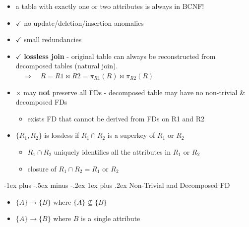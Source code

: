 \documentclass[10pt, landscape]{article}
\makeatletter
\renewcommand{\subsubsection}{\@startsection{subsubsection}{3}{0mm}%
  {-1ex plus -.5ex minus -.2ex}%
  {1ex plus .2ex}%
{\normalfont\small\bfseries}}%
\makeatother
\begin{document}
\begin{multicols}{4}
\begin{itemize}
    \item \attention a table with exactly one or two attributes is always in BCNF!
    \item $\checkmark$ no update/deletion/insertion anomalies
    \item $\checkmark$ small redundancies
    \item $\checkmark$ \textbf{lossless join} - original table can always be reconstructed from decomposed tables (natural join). $\quad \Rightarrow \quad R = R1 \Join R2 = \pi_{R1}(R) \Join \pi_{R2}(R)$
    \item $\times$ may \textbf{not} preserve all FDs - decomposed table may have no non-trivial \& decomposed FDs
      \begin{itemize}
        \item exists FD that cannot be derived from FDs on R1 and R2
      \end{itemize}
    \item {} $\{R_1, R_2\}$ is lossless if $R_1 \cap R_2$ is a superkey of $R_1$ or $R_2$ 
      \begin{itemize}
        \item $R_1 \cap R_2$ uniquely identifies all the attributes in $R_1$ or $R_2$
        \item closure of $R_1 \cap R_2 = R_1$ or $R_2$ 
      \end{itemize}
  \end{itemize}

  \subsubsection{Non-Trivial and Decomposed FD}
  \begin{itemize}
    \item {} $\{A\} \rightarrow \{B\}$ where $\{A\} \not\subseteq \{B\}$
    \item {} $\{A\} \rightarrow \{B\}$ where $B$ is a single attribute
  \end{itemize}


\end{multicols}
\end{document}
